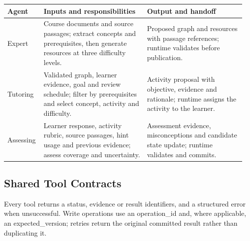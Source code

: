 \documentclass{article}
\begin{document}
{\small
\begin{tabular}{@{}>{\raggedright\arraybackslash}p{0.14\linewidth}>{\raggedright\arraybackslash}p{0.42\linewidth}>{\raggedright\arraybackslash}p{0.40\linewidth}@{}}
\toprule
\textbf{Agent} & \textbf{Inputs and responsibilities} & \textbf{Output and handoff} \\
\midrule
Expert & Course documents and source passages; extract concepts and prerequisites, then generate resources at three difficulty levels. & Proposed graph and resources with passage references; runtime validates before publication. \\
\addlinespace[2pt]
Tutoring & Validated graph, learner evidence, goal and review schedule; filter by prerequisites and select concept, activity and difficulty. & Activity proposal with objective, evidence and rationale; runtime assigns the activity to the learner. \\
\addlinespace[2pt]
Assessing & Learner response, activity rubric, source passages, hint usage and previous evidence; assess coverage and uncertainty. & Assessment evidence, misconceptions and candidate state update; runtime validates and commits. \\
\bottomrule
\end{tabular}
}

\subsection{Shared Tool Contracts}

Every tool returns a status, evidence or result identifiers, and a structured error when unsuccessful. Write operations use an operation\_id and, where applicable, an expected\_version; retries return the original committed result rather than duplicating it.
\end{document}
